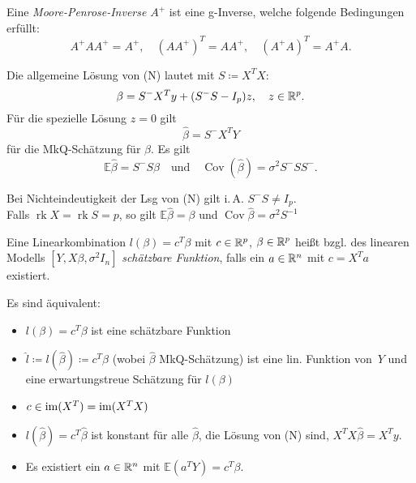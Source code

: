 \documentclass{cheat-sheet}
\newcommand{\E}{\mathbb{E}} %
\DeclareMathOperator{\rk}{rk} %
\DeclareMathOperator{\cov}{Cov} %
\begin{document}
\begin{defn}
  Eine \emph{Moore-Penrose-Inverse} $A^{+}$ ist eine g-Inverse, welche folgende Bedingungen erfüllt:
  \[
    A^{+} A A^{+} = A^{+}, \quad
    (A A^{+})^T = A A^{+}, \quad
    (A^{+} A)^T = A^{+} A.
  \]
\end{defn}


\begin{satz}
  Die allgemeine Lösung von (N) lautet mit $S \coloneqq X^T X$:
  \[
    \beta = S^{-} X^T y + (S^{-} S - I_p) z, \quad
    z \in \mathbb{R}^p.
  \]
  Für die spezielle Lösung $z = 0$ gilt
  \[
    \hat{\beta} = S^{-} X^T Y
  \]
  für die MkQ-Schätzung für $\beta$.
  Es gilt
  \[
    \E \hat{\beta} = S^{-} S \beta
    \quad \text{und} \quad
    \cov(\hat{\beta}) = \sigma^2 S^{-} S S^{-}.
  \]
\end{satz}

\begin{bem}
  Bei Nichteindeutigkeit der Lsg von (N) gilt i.\,A. $S^{-} S \neq I_p$. \\
  Falls $\rk X = \rk S = p$, so gilt $\E \hat{\beta} = \beta$ und $\cov \hat{\beta} = \sigma^2 S^{-1}$
\end{bem}


\begin{defn}
  Eine Linearkombination $l(\beta) = c^T \beta$ mit $c \in \mathbb{R}^p$, $\beta \in \mathbb{R}^p$ heißt bzgl. des linearen Modells $[Y, X \beta, \sigma^2 I_n]$ \emph{schätzbare Funktion}, falls ein $a \in \mathbb{R}^n$ mit $c = X^T a$ existiert.
\end{defn}


\begin{satz}
  Es sind äquivalent:
  \begin{itemize}
    \item $l(\beta) = c^T \beta$ ist eine schätzbare Funktion
    \item $\hat{l} \coloneqq l(\hat{\beta}) \coloneqq c^T \hat{\beta}$ (wobei $\hat{\beta}$ MkQ-Schätzung) ist eine lin. Funktion von~$Y$ und eine erwartungstreue Schätzung für $l(\beta)$ %
    \item $c \in \operatorname{im}(X^T) = \operatorname{im}(X^T X)$
    \item $l(\hat{\beta}) = c^T \hat{\beta}$ ist konstant für alle $\hat{\beta}$, die Lösung von (N) sind, \dh{} $X^T X \hat{\beta} = X^T y$.
    \item Es existiert ein $a \in \mathbb{R}^n$ mit $\E (a^T Y) = c^T \beta$.
  \end{itemize}
\end{satz}
\end{document}
